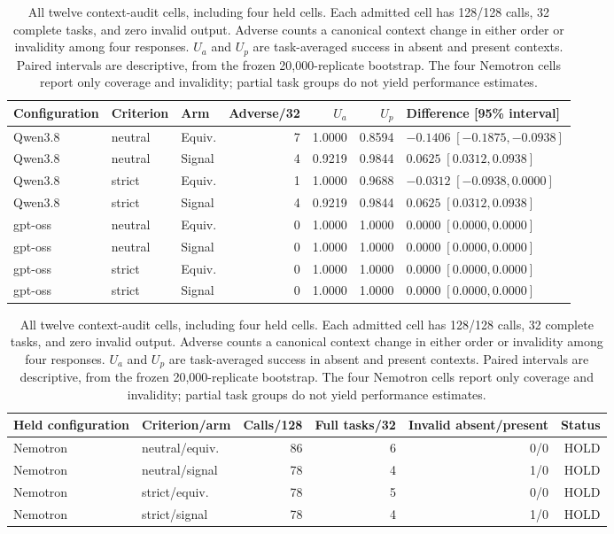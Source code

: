 \begin{table}[!htbp]
\centering\small
\setlength{\tabcolsep}{3pt}
\begin{tabular}{lllrrrl}
\toprule
Configuration & Criterion & Arm & Adverse/32 & $U_a$ & $U_p$ & Difference [95\% interval] \\
\midrule
Qwen3.8 & neutral & Equiv. & 7 & 1.0000 & 0.8594 & $-0.1406\;[-0.1875,-0.0938]$ \\
Qwen3.8 & neutral & Signal & 4 & 0.9219 & 0.9844 & $0.0625\;[0.0312,0.0938]$ \\
Qwen3.8 & strict & Equiv. & 1 & 1.0000 & 0.9688 & $-0.0312\;[-0.0938,0.0000]$ \\
Qwen3.8 & strict & Signal & 4 & 0.9219 & 0.9844 & $0.0625\;[0.0312,0.0938]$ \\
gpt-oss & neutral & Equiv. & 0 & 1.0000 & 1.0000 & $0.0000\;[0.0000,0.0000]$ \\
gpt-oss & neutral & Signal & 0 & 1.0000 & 1.0000 & $0.0000\;[0.0000,0.0000]$ \\
gpt-oss & strict & Equiv. & 0 & 1.0000 & 1.0000 & $0.0000\;[0.0000,0.0000]$ \\
gpt-oss & strict & Signal & 0 & 1.0000 & 1.0000 & $0.0000\;[0.0000,0.0000]$ \\
\bottomrule
\end{tabular}
\medskip
\begin{tabular}{llrrrr}
\toprule
Held configuration & Criterion/arm & Calls/128 & Full tasks/32 & Invalid absent/present & Status \\
\midrule
Nemotron & neutral/equiv. & 86 & 6 & 0/0 & HOLD \\
Nemotron & neutral/signal & 78 & 4 & 1/0 & HOLD \\
Nemotron & strict/equiv. & 78 & 5 & 0/0 & HOLD \\
Nemotron & strict/signal & 78 & 4 & 1/0 & HOLD \\
\bottomrule
\end{tabular}
\caption{All twelve context-audit cells, including four held cells. Each admitted cell has 128/128 calls, 32 complete tasks, and zero invalid output. Adverse counts a canonical context change in either order or invalidity among four responses. $U_a$ and $U_p$ are task-averaged success in absent and present contexts. Paired intervals are descriptive, from the frozen 20,000-replicate bootstrap. The four Nemotron cells report only coverage and invalidity; partial task groups do not yield performance estimates.}
\label{tab:v7-results}
\end{table}

